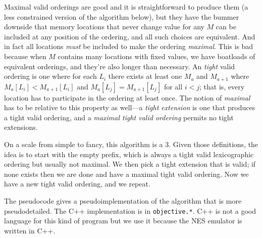 \documentclass[twocolumn]{article}
\begin{document}
Maximal valid orderings are good and it is straightforward to produce
them (a less constrained version of the algorithm below), but they
have the bummer downside that memory locations that never change value
for any $M$ can be included at any position of the ordering, and all
such choices are equivalent. And in fact all locations {\em must} be
included to make the ordering {\em maximal}. This is bad because when
$M$ contains many locations with fixed values, we have boatloads of
equivalent orderings, and they're also longer than necessary. An {\em
  tight} valid ordering is one where for each $L_i$ there exists at
least one $M_a$ and $M_{a+1}$ where $M_a[L_i] < M_{a+1}[L_i]$ and
$M_a[L_j] = M_{a+1}[L_j]$ for all $i < j$; that is, every location has
to participate in the ordering at least once. The notion of {\em
  maximal} has to be relative to this property as well---a {\em tight
  extension} is one that produces a tight valid ordering, and a {\em
  maximal tight valid ordering} permits no tight extensions.

On a scale from simple to fancy, this algorithm is a 3. Given those
definitions, the idea is to start with the empty prefix, which is
always a tight valid lexicographic ordering but usually not maximal.
We then pick a tight extension that is valid; if none exists then we are
done and have a maximal tight valid ordering. Now we have a new tight valid
ordering, and we repeat.

The pseudocode gives a pseudoimplementation of the algorithm that is
more pseudodetailed. The C++ implementation is in \verb+objective.*+.
C++ is not a good language for this kind of program but we use it
because the NES emulator is written in C++.
\end{document}
